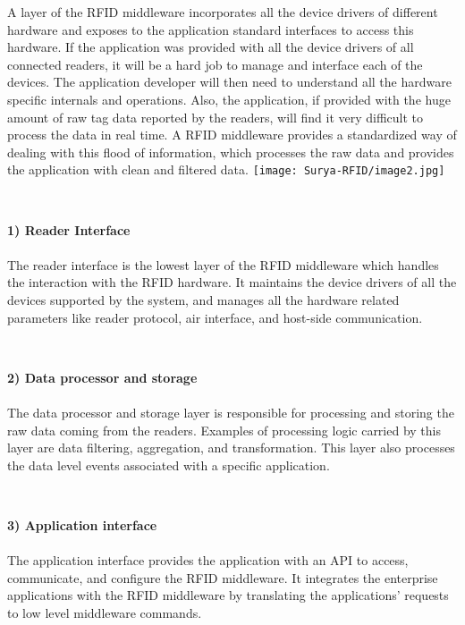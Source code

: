 \documentclass[a4paper,12pt]{article}
\begin{document}
\begin{multicols}{2}
\vspace{10pt}


A layer of the RFID middleware incorporates all the device drivers of different hardware and exposes to the application standard interfaces to access this hardware. If the application was provided with all the device drivers of all connected readers, it will be a hard job to manage and interface each of the devices. The application developer will then need to understand all the hardware specific internals and operations. Also, the application, if provided with the huge amount of raw tag data reported by the readers, will find it very difficult to process the data in real time. A RFID middleware provides a standardized way of dealing with this flood of information, which processes the raw data and provides the application with clean and filtered data.
\texttt{[image: Surya-RFID/image2.jpg]}


\\
\item \textbf{1) Reader Interface	}\\
\\
The reader interface is the lowest layer of the RFID middleware which handles the interaction with the RFID hardware. It maintains the device drivers of all the devices supported by the system, and manages all the hardware related parameters like reader protocol, air interface, and host-side communication.

\\
\item \textbf{2) Data processor and storage	}\\
\\
The data processor and storage layer is responsible for processing and storing the raw data coming from the readers. Examples of processing logic carried by this layer are data filtering, aggregation, and transformation. This layer also processes the data level events associated with a specific application.

\\

\item \textbf{3) Application interface	}\\
\\
The application interface provides the application with an API to access, communicate, and configure the RFID middleware. It integrates the enterprise applications with the RFID middleware by translating the applications’ requests to low level middleware commands.


\end{multicols}
\end{document}
